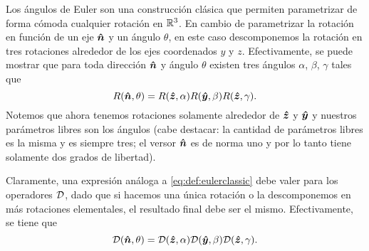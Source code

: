 \documentclass[10pt, a4paper]{article}
\numberwithin{equation}{subsection}
\begin{document}
Los ángulos de Euler son una construcción clásica que permiten parametrizar de
forma cómoda cualquier rotación en $\mathbb{R}^3$. En cambio de parametrizar la
rotación en función de un eje $\vu*{n}$ y un ángulo $\theta$, en este caso
descomponemos la rotación en tres rotaciones alrededor de los ejes coordenados
$y$ y $z$. Efectivamente, se puede mostrar que para toda dirección $\vu*{n}$ y
ángulo $\theta$ existen tres ángulos $\alpha$, $\beta$, $\gamma$ tales que
\begin{equation} \label{eq:def:eulerclassic}
  R(\vu*{n},\theta) = R(\vu*{z},\alpha)R(\vu*{y},\beta)R(\vu*{z},\gamma).
\end{equation}
Notemos que ahora tenemos rotaciones solamente alrededor de $\vu*{z}$ y
$\vu*{y}$ y nuestros parámetros libres son los ángulos (cabe destacar: la
cantidad de parámetros libres es la misma y es siempre tres; el versor
$\vu*{n}$ es de norma uno y por lo tanto tiene solamente dos grados de
libertad).

Claramente, una expresión análoga a \eqref{eq:def:eulerclassic} debe valer para
los operadores $\RotationOp$, dado que si hacemos una única rotación o la
descomponemos en más rotaciones elementales, el resultado final debe ser el
mismo. Efectivamente, se tiene que
\begin{equation} \label{eq:def:eulerquantum}
  \RotationOp(\vers{n},\theta) = \RotationOp(\vers{z},\alpha)
    \RotationOp(\vers{y},\beta)\RotationOp(\vers{z},\gamma).
\end{equation}
\end{document}
